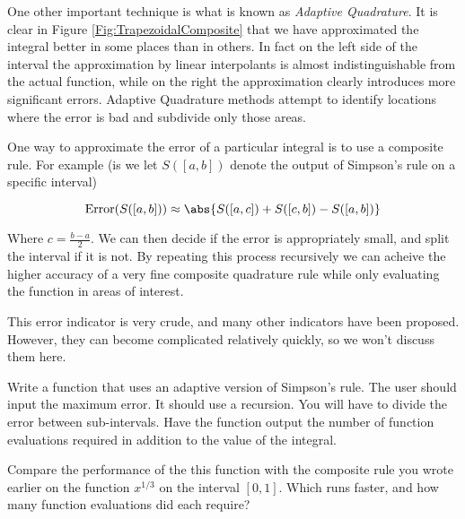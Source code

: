 One other important technique is what is known as \emph{Adaptive Quadrature}. It is clear in Figure \ref{Fig:TrapezoidalComposite} that we have approximated the integral better in some places than in others. In fact on the left side of the interval the approximation by linear interpolants is almost indistinguishable from the actual function, while on the right the approximation clearly introduces more significant errors. Adaptive Quadrature methods attempt to identify locations where the error is bad and subdivide only those areas.

One way to approximate the error of a particular integral is to use a composite rule. For example (is we let $S([a,b])$ denote the output of Simpson's rule on a specific interval)

\[
\mbox{Error}(S([a,b])) \approx \abs{S([a,c]) + S([c,b]) - S([a,b])}
\]

Where $c = \frac{b-a}{2}$. We can then decide if the error is appropriately small, and split the interval if it is not. By repeating this process recursively we can acheive the higher accuracy of a very fine composite quadrature rule while only evaluating the function in areas of interest.

This error indicator is very crude, and many other indicators have been proposed. However, they can become complicated relatively quickly, so we won't discuss them here. 

\begin{problem}
Write a function that uses an adaptive version of Simpson's rule. The user should input the maximum error. It should use a recursion. You will have to divide the error between sub-intervals. Have the function output the number of function evaluations required in addition to the value of the integral.

Compare the performance of the this function with the composite rule you wrote earlier on the function $x^{1/3}$ on the interval $[0,1]$. Which runs faster, and how many function evaluations did each require?
\end{problem}

